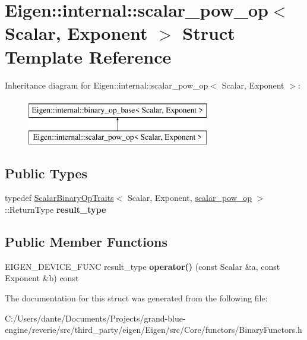 \hypertarget{struct_eigen_1_1internal_1_1scalar__pow__op}{}\section{Eigen\+::internal\+::scalar\+\_\+pow\+\_\+op$<$ Scalar, Exponent $>$ Struct Template Reference}
\label{struct_eigen_1_1internal_1_1scalar__pow__op}
Inheritance diagram for Eigen\+::internal\+::scalar\+\_\+pow\+\_\+op$<$ Scalar, Exponent $>$\+:\begin{figure}[H]
\begin{center}
\leavevmode
\includegraphics[height=2.000000cm]{struct_eigen_1_1internal_1_1scalar__pow__op}
\end{center}
\end{figure}
\subsection*{Public Types}
\begin{DoxyCompactItemize}
\item 
\mbox{\label{struct_eigen_1_1internal_1_1scalar__pow__op_a00cfb932d02bdffd5a08ef0d98fe8146}} 
typedef \mbox{\hyperlink{struct_eigen_1_1_scalar_binary_op_traits}{Scalar\+Binary\+Op\+Traits}}$<$ Scalar, Exponent, \mbox{\hyperlink{struct_eigen_1_1internal_1_1scalar__pow__op}{scalar\+\_\+pow\+\_\+op}} $>$\+::Return\+Type {\bfseries result\+\_\+type}
\end{DoxyCompactItemize}
\subsection*{Public Member Functions}
\begin{DoxyCompactItemize}
\item 
\mbox{\label{struct_eigen_1_1internal_1_1scalar__pow__op_a0d814f4a6832c9715a56cf21d2bd98fe}} 
E\+I\+G\+E\+N\+\_\+\+D\+E\+V\+I\+C\+E\+\_\+\+F\+U\+NC result\+\_\+type {\bfseries operator()} (const Scalar \&a, const Exponent \&b) const
\end{DoxyCompactItemize}


The documentation for this struct was generated from the following file\+:\begin{DoxyCompactItemize}
\item 
C\+:/\+Users/dante/\+Documents/\+Projects/grand-\/blue-\/engine/reverie/src/third\+\_\+party/eigen/\+Eigen/src/\+Core/functors/Binary\+Functors.\+h\end{DoxyCompactItemize}

